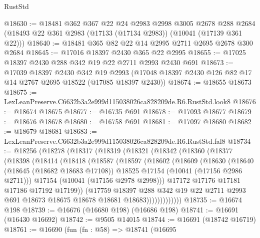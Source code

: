 \begin{lexlean}{RustStd}
\begin{coremodule}
@18630 := @18481
    @362
    @367
    @22
    @24
    @2983
    @2998
    @3005
    @2678
    @288
    @2684
    (@18493 @22 @361 @2983 (@17133 (@17134 @2983)) (@10041 (@17139 @361 @22)))
@18640 := @18481 @365 @82 @22 @14 @2995 @2711 @2695 @2678 @300 @2684
@18645 := @17016 @18397 @2430 @365 @22 @2995
@18655 := @17025 @18397 @2430 @288 @342 @19 @22 @2711 @2993 @2430 @691
@18673 := @17039
    @18397
    @2430
    @342
    @19
    @2993
    (@17048 @18397 @2430 @126 @82 @17 @14 @2767 @2695 @18522 (@17085 @18397 @2430))
@18674 := @18655 @18673
@18675 := LexLeanPreserve.C6632b3a2e999d115038026ca828209de.R6.RustStd.look8
@18676 := @18674 @18675
@18677 := @16735 @691
@18678 := @17093 @18677
@18679 := @18676 @18678
@18680 := @16758 @691
@18681 := @17097 @18680
@18682 := @18679 @18681
@18683 := LexLeanPreserve.C6632b3a2e999d115038026ca828209de.R6.RustStd.fal8
@18734 := @18256
    (@18278
      (@18317
        (@18319
          (@18321
            (@18342
              (@18360
                (@18377
                  (@18398
                    (@18414
                      (@18418
                        (@18587
                          (@18597
                            (@18602
                              (@18609
                                (@18630
                                  (@18640
                                    (@18645 (@18682 @18683 @17108))
                                    @18525
                                    @17154
                                    (@10041 (@17156 @2986 @2711)))
                                  @17154
                                  (@10041 (@17156 @2978 @2998)))
                                @17172
                                @17176
                                @17181
                                @17186
                                @17192
                                @17199))
                            (@17759
                              @18397
                              @288
                              @342
                              @19
                              @22
                              @2711
                              @2993
                              @691
                              @18673
                              @18675
                              @18678
                              @18681
                              @18683)))))))))))))
@18735 := @16674 @198
@18739 := @16676 (@16680 @198) (@16686 @198)
@18741 := @16691 (@16430 @16692)
@18742 := @9505 @14015
@18744 := @16691 (@18742 @16719)
@18761 := @16690
    (fun (fn : @58) =>
    @18741
      (@16695

\end{coremodule}
\end{lexlean}

